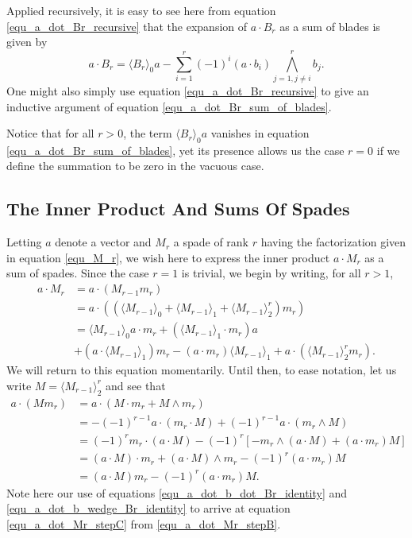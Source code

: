 \documentclass{birkjour}
\theoremstyle{definition}
\theoremstyle{remark}
\numberwithin{equation}{section}
\begin{document}
Applied recursively, it is easy to see here from equation \eqref{equ_a_dot_Br_recursive} that the expansion of
$a\cdot B_r$ as a sum of blades is given by
\begin{equation}\label{equ_a_dot_Br_sum_of_blades}
a\cdot B_r = \langle B_r\rangle_0a - \sum_{i=1}^r(-1)^i(a\cdot b_i)\bigwedge_{j=1,j\neq i}^r b_j.
\end{equation}
One might also simply use equation \eqref{equ_a_dot_Br_recursive} to give an inductive
argument of equation \eqref{equ_a_dot_Br_sum_of_blades}.

Notice that for all $r>0$, the term $\langle B_r\rangle_0a$ vanishes in equation \eqref{equ_a_dot_Br_sum_of_blades},
yet its presence allows us the case $r=0$ if we define the summation to be zero in the vacuous case.


\subsection{The Inner Product And Sums Of Spades}

Letting $a$ denote a vector and $M_r$ a spade of rank $r$ having the factorization
given in equation \eqref{equ_M_r},
we wish here to express the inner product $a\cdot M_r$ as a sum of spades.
Since the case $r=1$ is trivial, we begin by writing, for all $r>1$,
\begin{align}
a\cdot M_r &= a\cdot (M_{r-1}m_r)\nonumber \\
 &= a\cdot((\langle M_{r-1}\rangle_0 + \langle M_{r-1}\rangle_1 + \langle M_{r-1}\rangle_2^r)m_r)\nonumber \\
 &= \langle M_{r-1}\rangle_0a\cdot m_r + (\langle M_{r-1}\rangle_1\cdot m_r)a\nonumber \\
 &+ (a\cdot\langle M_{r-1}\rangle_1)m_r - (a\cdot m_r)\langle M_{r-1}\rangle_1 + a\cdot(\langle M_{r-1}\rangle_2^rm_r).\label{equ_a_dot_Mr_stepA}
\end{align}
We will return to this equation momentarily.  Until then, to ease notation, let us write $M=\langle M_{r-1}\rangle_2^r$ and see that
\begin{align}
a\cdot(Mm_r)
 &= a\cdot(M\cdot m_r + M\wedge m_r)\nonumber \\
 &= -(-1)^{r-1}a\cdot(m_r\cdot M) + (-1)^{r-1}a\cdot(m_r\wedge M)\label{equ_a_dot_Mr_stepB} \\
 &= (-1)^rm_r\cdot(a\cdot M) - (-1)^r\left[-m_r\wedge(a\cdot M)+(a\cdot m_r)M\right]\label{equ_a_dot_Mr_stepC} \\
 &= (a\cdot M)\cdot m_r + (a\cdot M)\wedge m_r - (-1)^r(a\cdot m_r)M\nonumber \\
 &= (a\cdot M)m_r - (-1)^r(a\cdot m_r)M.\label{equ_a_dot_Mr_stepD}
\end{align}
Note here our use of equations \eqref{equ_a_dot_b_dot_Br_identity} and \eqref{equ_a_dot_b_wedge_Br_identity} to
arrive at equation \eqref{equ_a_dot_Mr_stepC} from \eqref{equ_a_dot_Mr_stepB}.
\end{document}
